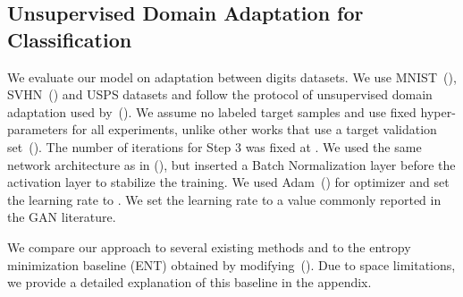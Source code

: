 \documentclass{article} \usepackage{iclr2018_conference,times}
\begin{document}
\subsection{Unsupervised Domain Adaptation for Classification}

We evaluate our model on adaptation between digits datasets. We use MNIST~(\cite{lecun1998gradient}), SVHN~(\cite{netzer2011reading}) and USPS datasets and follow the protocol of unsupervised domain adaptation used by~(\cite{tzeng2017adversarial}). We assume no labeled target samples and use fixed hyper-parameters for all experiments, unlike other works that use a target validation set~(\cite{saito2017asymmetric}). The number of iterations for Step 3 was fixed at .
We used the same network architecture as in (\cite{tzeng2017adversarial}), but inserted a Batch Normalization layer before the activation layer to stabilize the training. We used Adam~(\cite{kingma2014adam}) for optimizer and set the learning rate to . We set the learning rate to a value commonly reported in the GAN literature.


We compare our approach to several existing methods and to the entropy minimization baseline (ENT) obtained by modifying~(\cite{springenberg2015unsupervised}). Due to space limitations, we provide a detailed explanation of this baseline in the appendix.
\end{document}
